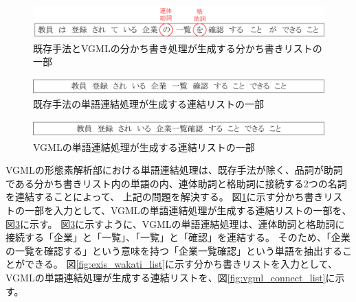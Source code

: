 \begin{figure}[t]
    \begin{center}
        \includegraphics[width=1.0\columnwidth]{image/exis_wakati.png}
        \caption{既存手法とVGMLの分かち書き処理が生成する分かち書きリストの一部}
        \label{fig:exis_wakati}
    \end{center}
\end{figure}

\begin{figure}[t]
    \begin{center}
        \includegraphics[width=1.0\columnwidth]{image/exis_connect.png}
        \caption{既存手法の単語連結処理が生成する連結リストの一部}
        \label{fig:exis_connect}
    \end{center}
\end{figure}

\begin{figure}[t]
    \begin{center}
        \includegraphics[width=1.0\columnwidth]{image/vgml_connect.png}
        \caption{VGMLの単語連結処理が生成する連結リストの一部}
        \label{fig:vgml_connect}
    \end{center}
\end{figure}

VGMLの形態素解析部における単語連結処理は、既存手法が除く、品詞が助詞である分かち書きリスト内の単語の内、連体助詞と格助詞に接続する2つの名詞を連結することによって、
上記の問題を解決する。
図\ref{fig:exis_wakati}に示す分かち書きリストの一部を入力として、VGMLの単語連結処理が生成する連結リストの一部を、図\ref{fig:vgml_connect}に示す。
図\ref{fig:vgml_connect}に示すように、VGMLの単語連結処理は、連体助詞と格助詞に接続する「企業」と「一覧」、「一覧」と「確認」を連結する。
そのため、「企業の一覧を確認する」という意味を持つ「企業一覧確認」という単語を抽出することができる。
図\ref{fig:exis_wakati_list}に示す分かち書きリストを入力として、VGMLの単語連結処理が生成する連結リストを、図\ref{fig:vgml_connect_list}に示す。

